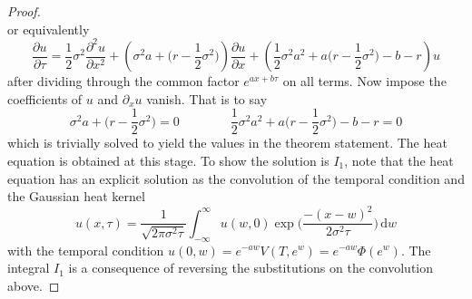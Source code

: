 \documentclass[12pt]{article}
\theoremstyle{definition}
\theoremstyle{remark}
\begin{document}
\begin{proof}
$$	$$
	or equivalently
	$$
	\frac{\partial u}{\partial \tau} = \frac{1}{2} \sigma^{2} \frac{\partial^2 u}{\partial x^2} + \left( \sigma^2 a + \Big( r - \frac{1}{2} \sigma^2 \Big) \right) \frac{\partial u}{\partial x} + \left( \frac{1}{2} \sigma^2 a^2 + a \Big( r- \frac{1}{2} \sigma^2 \Big) - b - r \right) u
	$$
	after dividing through the common factor $e^{ax + b\tau}$ on all terms. Now impose the coefficients of $u$ and $\partial_x u$ vanish. That is to say
	$$
	\sigma^2 a + \Big( r - \frac{1}{2} \sigma^2 \Big) = 0 \qquad\qquad \frac{1}{2} \sigma^2 a^2 + a \Big( r- \frac{1}{2} \sigma^2 \Big) - b - r = 0
	$$
	which is trivially solved to yield the values in the theorem statement. The heat equation is obtained at this stage. To show the solution is $I_1$, note that the heat equation has an explicit solution as the convolution of the temporal condition and the Gaussian heat kernel
	$$
	u(x,\tau) = \frac{1}{\sqrt{2\pi \sigma^2 \tau}} \int_{-\infty}^{\infty} u(w,0) \exp\Big(\frac{-(x-w)^2}{2\sigma^2 \tau}\Big) \,\mathrm{d}w
	$$
	with the temporal condition $u(0,w) = e^{-aw}V(T,e^w) = e^{-aw}\Phi(e^w)$. The integral $I_1$ is a consequence of reversing the substitutions on the convolution above.
\end{proof}
\end{document}
